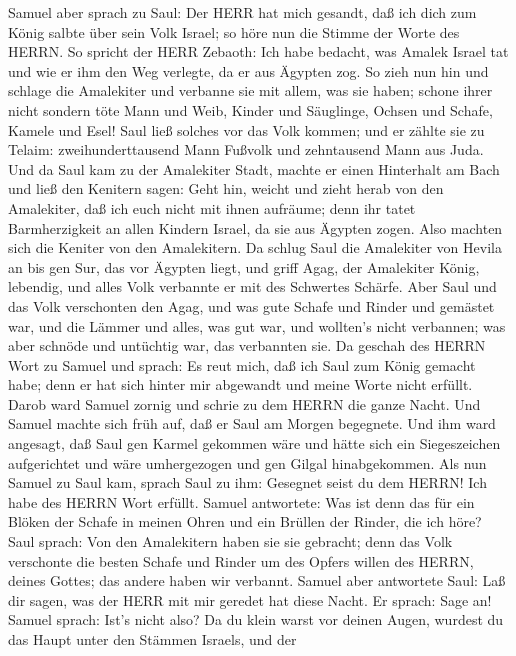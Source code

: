  Samuel aber sprach zu Saul: Der HERR hat mich gesandt, daß
ich dich zum König salbte über sein Volk Israel; so höre nun die Stimme
der Worte des HERRN.  So spricht der HERR Zebaoth: Ich habe
bedacht, was Amalek Israel tat und wie er ihm den Weg verlegte, da er
aus Ägypten zog.  So zieh nun hin und schlage die Amalekiter
und verbanne sie mit allem, was sie haben; schone ihrer nicht sondern
töte Mann und Weib, Kinder und Säuglinge, Ochsen und Schafe, Kamele und
Esel!  Saul ließ solches vor das Volk kommen; und er zählte
sie zu Telaim: zweihunderttausend Mann Fußvolk und zehntausend Mann aus
Juda.  Und da Saul kam zu der Amalekiter Stadt, machte er
einen Hinterhalt am Bach  und ließ den Kenitern sagen: Geht
hin, weicht und zieht herab von den Amalekiter, daß ich euch nicht mit
ihnen aufräume; denn ihr tatet Barmherzigkeit an allen Kindern Israel,
da sie aus Ägypten zogen. Also machten sich die Keniter von den
Amalekitern.  Da schlug Saul die Amalekiter von Hevila an
bis gen Sur, das vor Ägypten liegt,  und griff Agag, der
Amalekiter König, lebendig, und alles Volk verbannte er mit des
Schwertes Schärfe.  Aber Saul und das Volk verschonten den
Agag, und was gute Schafe und Rinder und gemästet war, und die Lämmer
und alles, was gut war, und wollten's nicht verbannen; was aber schnöde
und untüchtig war, das verbannten sie.  Da geschah des
HERRN Wort zu Samuel und sprach:  Es reut mich, daß ich
Saul zum König gemacht habe; denn er hat sich hinter mir abgewandt und
meine Worte nicht erfüllt. Darob ward Samuel zornig und schrie zu dem
HERRN die ganze Nacht.  Und Samuel machte sich früh auf,
daß er Saul am Morgen begegnete. Und ihm ward angesagt, daß Saul gen
Karmel gekommen wäre und hätte sich ein Siegeszeichen aufgerichtet und
wäre umhergezogen und gen Gilgal hinabgekommen.  Als nun
Samuel zu Saul kam, sprach Saul zu ihm: Gesegnet seist du dem HERRN! Ich
habe des HERRN Wort erfüllt.  Samuel antwortete: Was ist
denn das für ein Blöken der Schafe in meinen Ohren und ein Brüllen der
Rinder, die ich höre?  Saul sprach: Von den Amalekitern
haben sie sie gebracht; denn das Volk verschonte die besten Schafe und
Rinder um des Opfers willen des HERRN, deines Gottes; das andere haben
wir verbannt.  Samuel aber antwortete Saul: Laß dir sagen,
was der HERR mit mir geredet hat diese Nacht. Er sprach: Sage an!
 Samuel sprach: Ist's nicht also? Da du klein warst vor
deinen Augen, wurdest du das Haupt unter den Stämmen Israels, und der
